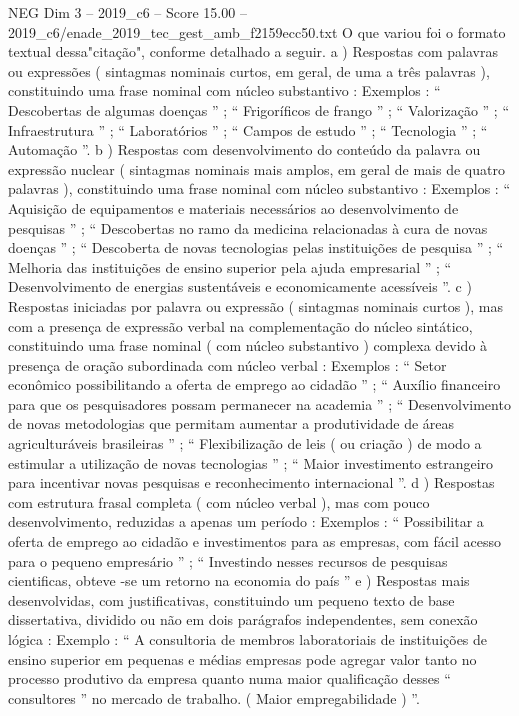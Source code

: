 \begin{textsample}{NEG Dim 3 – 2019\_c6 – Score 15.00 – 2019\_c6/enade\_2019\_tec\_gest\_amb\_f2159ecc50.txt}
O que variou foi o formato textual dessa"citação", conforme detalhado a seguir. a ) Respostas com palavras ou expressões ( sintagmas nominais curtos, em geral, de uma a três palavras ), constituindo uma frase nominal com núcleo substantivo : Exemplos : “ Descobertas de algumas doenças ” ; “ Frigoríficos de frango ” ; “ Valorização ” ; “ Infraestrutura ” ; “ Laboratórios ” ; “ Campos de estudo ” ; “ Tecnologia ” ; “ Automação ”. b ) Respostas com desenvolvimento do conteúdo da palavra ou expressão nuclear ( sintagmas nominais mais amplos, em geral de mais de quatro palavras ), constituindo uma frase nominal com núcleo substantivo : Exemplos : “ Aquisição de equipamentos e materiais necessários ao desenvolvimento de pesquisas ” ; “ Descobertas no ramo da medicina relacionadas à cura de novas doenças ” ; “ Descoberta de novas tecnologias pelas instituições de pesquisa ” ; “ Melhoria das instituições de ensino superior pela ajuda empresarial ” ; “ Desenvolvimento de energias sustentáveis e economicamente acessíveis ”. c ) Respostas iniciadas por palavra ou expressão ( sintagmas nominais curtos ), mas com a presença de expressão verbal na complementação do núcleo sintático, constituindo uma frase nominal ( com núcleo substantivo ) complexa devido à presença de oração subordinada com núcleo verbal : Exemplos : “ Setor econômico possibilitando a oferta de emprego ao cidadão ” ; “ Auxílio financeiro para que os pesquisadores possam permanecer na academia ” ; “ Desenvolvimento de novas metodologias que permitam aumentar a produtividade de áreas agriculturáveis brasileiras ” ; “ Flexibilização de leis ( ou criação ) de modo a estimular a utilização de novas tecnologias ” ; “ Maior investimento estrangeiro para incentivar novas pesquisas e reconhecimento internacional ”. d ) Respostas com estrutura frasal completa ( com núcleo verbal ), mas com pouco desenvolvimento, reduzidas a apenas um período : Exemplos : “ Possibilitar a oferta de emprego ao cidadão e investimentos para as empresas, com fácil acesso para o pequeno empresário ” ; “ Investindo nesses recursos de pesquisas cientificas, obteve -se um retorno na economia do país ” e ) Respostas mais desenvolvidas, com justificativas, constituindo um pequeno texto de base dissertativa, dividido ou não em dois parágrafos independentes, sem conexão lógica : Exemplo : “ A consultoria de membros laboratoriais de instituições de ensino superior em pequenas e médias empresas pode agregar valor tanto no processo produtivo da empresa quanto numa maior qualificação desses “ consultores ” no mercado de trabalho. ( Maior empregabilidade ) ”.

\end{textsample}
